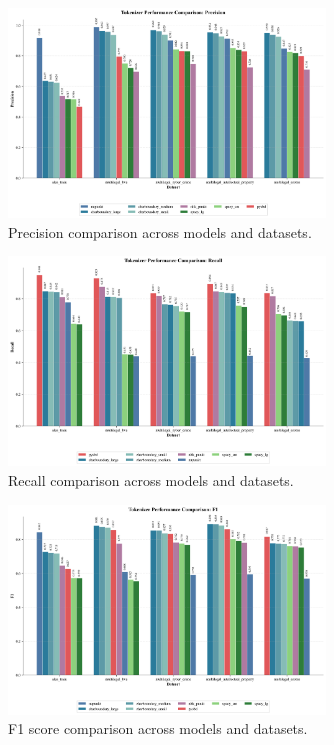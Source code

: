 \begin{figure}[htbp]
    \centering
    \includegraphics[width=0.75\textwidth]{figures/precision.png}
    \caption{Precision comparison across models and datasets.}
    \label{fig:precision_comparison}
\end{figure}

\begin{figure}[htbp]
    \centering
    \includegraphics[width=0.75\textwidth]{figures/recall.png}
    \caption{Recall comparison across models and datasets.}
    \label{fig:recall_comparison}
\end{figure}

\begin{figure}[htbp]
    \centering
    \includegraphics[width=0.75\textwidth]{figures/f1.png}
    \caption{F1 score comparison across models and datasets.}
    \label{fig:f1_comparison}
\end{figure}

